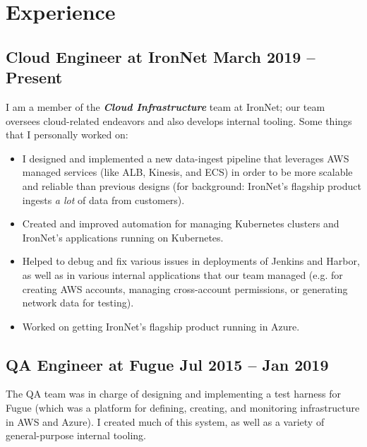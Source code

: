 \documentclass[12pt]{article}
\begin{document}

\section*{Experience}

\subsection*{Cloud Engineer at IronNet \hfill March 2019 -- Present}

I am a member of the \textbf{\textsl{Cloud Infrastructure}} team at IronNet; our
team oversees cloud-related endeavors and also develops internal tooling. Some
things that I personally worked on:

\begin{itemize}
\item I designed and implemented a new data-ingest pipeline that leverages AWS
  managed services (like ALB, Kinesis, and ECS) in order to be more scalable and
  reliable than previous designs (for background: IronNet's flagship product
  ingests \textit{a lot} of data from customers).
\item Created and improved automation for managing Kubernetes clusters and
  IronNet's applications running on Kubernetes.
\item Helped to debug and fix various issues in deployments of Jenkins and
  Harbor, as well as in various internal applications that our team managed
  (e.g. for creating AWS accounts, managing cross-account permissions, or
  generating network data for testing).
\item Worked on getting IronNet's flagship product running in Azure.
\end{itemize}

     
 

\subsection*{QA Engineer at Fugue \hfill Jul 2015 -- Jan 2019}

The QA team was in charge of designing and implementing a test harness for Fugue
(which was a platform for defining, creating, and monitoring infrastructure in
AWS and Azure). I created much of this system, as well as a variety of
general-purpose internal tooling.
\end{document}
